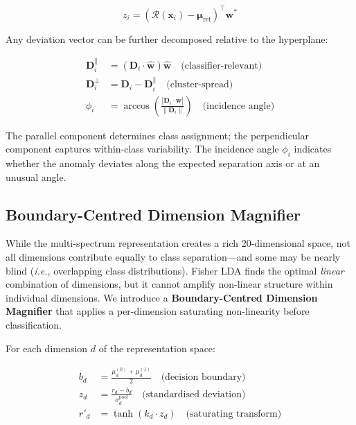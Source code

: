 \documentclass[journal]{IEEEtran}
\newcommand{\ie}{\textit{i.e.}}
\newcommand{\calR}{\mathcal{R}}
\newcommand{\norm}[1]{\left\lVert#1\right\rVert}
\begin{document}
\begin{equation}
z_i = (\calR(\mathbf{x}_i) - \boldsymbol{\mu}_{\text{ref}})^\top \mathbf{w}^*
\label{eq:proj_score}
\end{equation}

Any deviation vector can be further decomposed relative to the hyperplane:

\begin{align}
\mathbf{D}_i^{\parallel} &= (\mathbf{D}_i \cdot \hat{\mathbf{w}}) \hat{\mathbf{w}} \quad\text{(classifier-relevant)} \label{eq:parallel} \\
\mathbf{D}_i^{\perp} &= \mathbf{D}_i - \mathbf{D}_i^{\parallel} \quad\text{(cluster-spread)} \label{eq:perp} \\
\phi_i &= \arccos\!\left(\frac{|\mathbf{D}_i \cdot \hat{\mathbf{w}}|}{\norm{\mathbf{D}_i}}\right) \quad\text{(incidence angle)} \label{eq:angle}
\end{align}

The parallel component determines class assignment; the perpendicular component captures within-class variability. The incidence angle $\phi_i$ indicates whether the anomaly deviates along the expected separation axis or at an unusual angle.

\subsection{Boundary-Centred Dimension Magnifier}
\label{ssec:magnifier}

While the multi-spectrum representation creates a rich 20-dimensional space, not all dimensions contribute equally to class separation---and some may be nearly blind (\ie, overlapping class distributions). Fisher LDA finds the optimal \textit{linear} combination of dimensions, but it cannot amplify non-linear structure within individual dimensions. We introduce a \textbf{Boundary-Centred Dimension Magnifier} that applies a per-dimension saturating non-linearity before classification.

For each dimension $d$ of the representation space:

\begin{align}
b_d &= \frac{\mu_d^{(0)} + \mu_d^{(1)}}{2} \quad\text{(decision boundary)} \label{eq:boundary} \\
z_d &= \frac{r_d - b_d}{\sigma_d^{\text{pool}}} \quad\text{(standardised deviation)} \label{eq:std_dev} \\
r'_d &= \tanh(k_d \cdot z_d) \quad\text{(saturating transform)} \label{eq:tanh}
\end{align}
\end{document}
